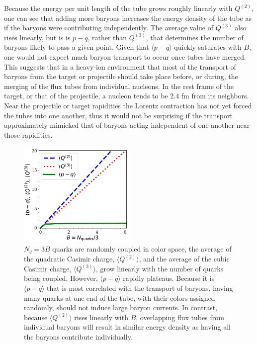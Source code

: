 \documentclass[aps, prc, 12pt, nofootinbib, showpacs, superscriptaddress, tightenlines, groupedaddress]{revtex4-2}
\begin{document}
Because the energy per unit length of the tube grows roughly linearly with $Q^{(2)}$, one can see that adding more baryons increases the energy density of the tube as if the baryons were contributing independently. The average value of $Q^{(3)}$ also rises linearly, but is is $p-q$, rather than $Q^{(3)}$, that determines the number of baryons likely to pass a given point. Given that $\langle p-q\rangle$ quickly saturates with $B$, one would not expect much baryon transport to occur once tubes have merged. This suggests that in a heavy-ion environment that most of the transport of baryons from the target or projectile should take place before, or during, the merging of the flux tubes from individual nucleons. In the rest frame of the target, or that of the projectile, a nucleon tends to be 2.4 fm from its neighbors. Near the projectile or target rapidities the Lorentz contraction has not yet forced the tubes into one another, thus it would not be surprising if the transport approximately mimicked that of baryons acting independent of one another near those rapidities. 
\begin{figure}
\centerline{\includegraphics[width=0.5\textwidth]{figs/pminusq}}
\caption{\label{fig:pminusq}
$N_q=3B$ quarks are randomly coupled in color space, the average of the quadratic Casimir charge, $\langle Q^{(2)}\rangle$, and the average of the cubic Casimir charge, $\langle Q^{(3)}\rangle$, grow linearly with the number of quarks being coupled. However, $\langle p-q\rangle$ rapidly plateaus. Because it is $\langle p-q\rangle$ that is most correlated with the transport of baryons, having many quarks at one end of the tube, with their colors assigned randomly, should not induce large baryon currents. In contrast, because $\langle Q^{(2)}\rangle$ rises linearly with $B$, overlapping flux tubes from individual baryons will result in similar energy density as having all the baryons contribute individually.
}
\end{figure}
\end{document}
